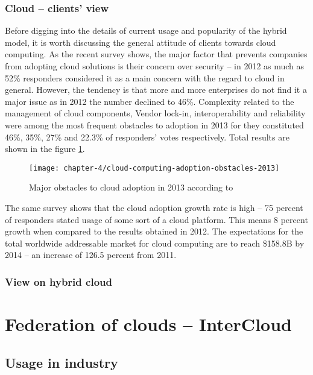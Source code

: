 \subsubsection*{Cloud -- clients' view}
Before digging into the details of current usage and popularity of the hybrid model, it is worth discussing the general attitude of clients towards cloud computing. As the recent survey \cite{NBSurvey13} shows, the major factor that prevents companies from adopting cloud solutions is their concern over security -- in 2012 as much as 52\% responders considered it as a main concern with the regard to cloud in general. However, the tendency is that more and more enterprises do not find it a major issue as in 2012 the number declined to 46\%.
Complexity related to the management of cloud components, Vendor lock-in, interoperability and reliability were among the most frequent obstacles to adoption in 2013 for they constituted 46\%, 35\%, 27\% and 22.3\% of responders' votes respectively. Total results are shown in the figure \ref{ch4:cloud-computing-adoption-obstacles-2013}.
\begin{figure}[!ht]
  \begin{center}
    \texttt{[image: chapter-4/cloud-computing-adoption-obstacles-2013]}
  \end{center}
  \caption{Major obstacles to cloud adoption in 2013 according to \cite{NBSurvey13}}
  \label{ch4:cloud-computing-adoption-obstacles-2013}
\end{figure}

The same survey shows that the cloud adoption growth rate is high -- 75 percent of responders stated usage of some sort of a cloud platform. This means 8 percent growth when compared to the results obtained in 2012. The expectations for the total worldwide addressable market for cloud computing are to reach \$158.8B by 2014 -- an increase of 126.5 percent from 2011.

\subsubsection*{View on hybrid cloud}

\section{Federation of clouds -- InterCloud}

\subsection{Usage in industry}

